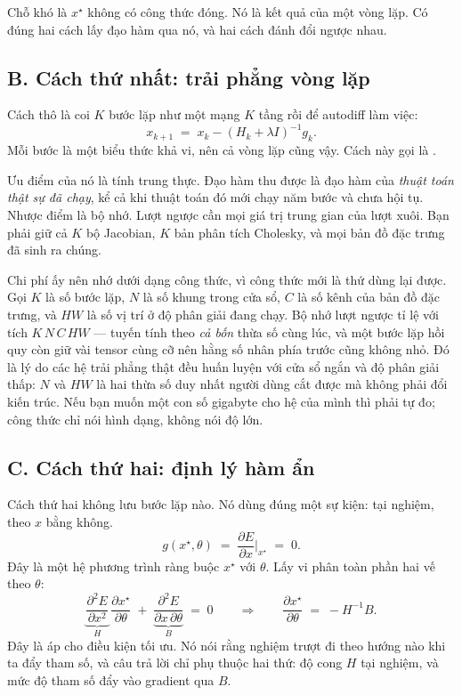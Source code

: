 \documentclass[../../deep_learning.tex]{subfiles}
\begin{document}
Chỗ khó là \(x^\star\) không có công thức đóng. Nó là kết quả của một vòng lặp. Có đúng hai cách lấy đạo hàm qua nó, và hai cách đánh đổi ngược nhau.

\subsection{B. Cách thứ nhất: trải phẳng vòng lặp}
Cách thô là coi \(K\) bước lặp như một mạng \(K\) tầng rồi để autodiff làm việc:
\[
x_{k+1} \;=\; x_k - (H_k+\lambda I)^{-1} g_k .
\]
Mỗi bước là một biểu thức khả vi, nên cả vòng lặp cũng vậy. Cách này gọi là .

Ưu điểm của nó là tính trung thực. Đạo hàm thu được là đạo hàm của \emph{thuật toán thật sự đã chạy}, kể cả khi thuật toán đó mới chạy năm bước và chưa hội tụ. Nhược điểm là bộ nhớ. Lượt ngược cần mọi giá trị trung gian của lượt xuôi. Bạn phải giữ cả \(K\) bộ Jacobian, \(K\) bản phân tích Cholesky, và mọi bản đồ đặc trưng đã sinh ra chúng.

Chi phí ấy nên nhớ dưới dạng công thức, vì công thức mới là thứ dùng lại được. Gọi \(K\) là số bước lặp, \(N\) là số khung trong cửa sổ, \(C\) là số kênh của bản đồ đặc trưng, và \(HW\) là số vị trí ở độ phân giải đang chạy. Bộ nhớ lượt ngược tỉ lệ với tích \(K\,N\,C\,HW\) --- tuyến tính theo \emph{cả bốn} thừa số cùng lúc, và một bước lặp hồi quy còn giữ vài tensor cùng cỡ nên hằng số nhân phía trước cũng không nhỏ. Đó là lý do các hệ trải phẳng thật đều huấn luyện với cửa sổ ngắn và độ phân giải thấp: \(N\) và \(HW\) là hai thừa số duy nhất người dùng cắt được mà không phải đổi kiến trúc. Nếu bạn muốn một con số gigabyte cho hệ của mình thì phải tự đo; công thức chỉ nói hình dạng, không nói độ lớn.

\subsection{C. Cách thứ hai: định lý hàm ẩn}
Cách thứ hai không lưu bước lặp nào. Nó dùng đúng một sự kiện: tại nghiệm,  theo \(x\) bằng không.
\[
g(x^\star,\theta) \;=\; \frac{\partial E}{\partial x}\Big|_{x^\star} \;=\; 0 .
\]
Đây là một hệ phương trình ràng buộc \(x^\star\) với \(\theta\). Lấy vi phân toàn phần hai vế theo \(\theta\):
\[
\underbrace{\frac{\partial^2 E}{\partial x^2}}_{H}\,\frac{\partial x^\star}{\partial\theta}
\;+\; \underbrace{\frac{\partial^2 E}{\partial x\,\partial\theta}}_{B} \;=\; 0
\qquad\Longrightarrow\qquad
\frac{\partial x^\star}{\partial\theta} \;=\; -H^{-1}B .
\]
Đây là  áp cho điều kiện tối ưu. Nó nói rằng nghiệm trượt đi theo hướng nào khi ta đẩy tham số, và câu trả lời chỉ phụ thuộc hai thứ: độ cong \(H\) tại nghiệm, và mức độ tham số đẩy vào gradient qua \(B\).
\end{document}
